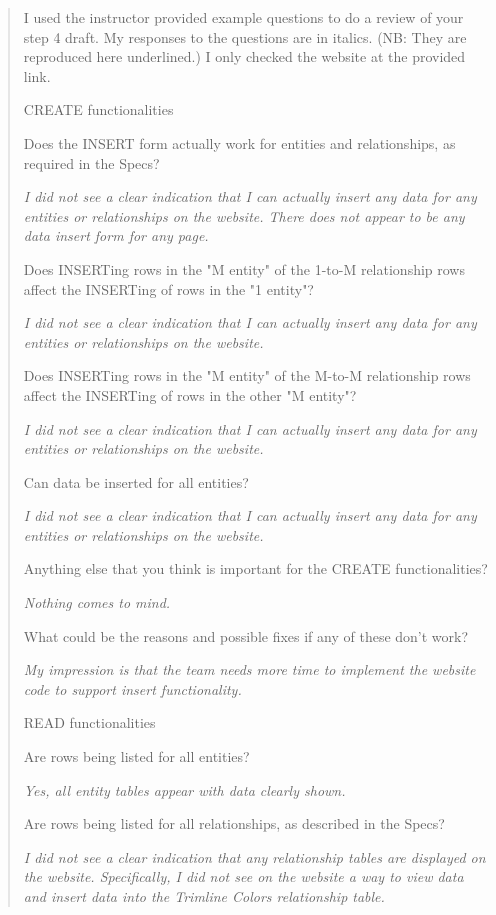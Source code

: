 \documentclass[11pt,letterpaper,oneside]{amsart}
\begin{document}
\begin{quotation}

I used the instructor provided example questions to do a review of your step 4 draft. My responses to the questions are in italics. (NB: They are reproduced here underlined.) I only checked the website at the provided link.
 
CREATE functionalities

Does the INSERT form actually work for entities and relationships, as required in the Specs?

\emph{I did not see a clear indication that I can actually insert any data for any entities or relationships on the website. There does not appear to be any data insert form for any page.}

Does INSERTing rows in the "M entity" of the 1-to-M relationship rows affect the INSERTing of rows in the "1 entity"?

\emph{I did not see a clear indication that I can actually insert any data for any entities or relationships on the website.}

Does INSERTing rows in the "M entity" of the M-to-M relationship rows affect the INSERTing of rows in the other "M entity"?

\emph{I did not see a clear indication that I can actually insert any data for any entities or relationships on the website.}

Can data be inserted for all entities?

\emph{I did not see a clear indication that I can actually insert any data for any entities or relationships on the website.}

Anything else that you think is important for the CREATE functionalities?

\emph{Nothing comes to mind.}

What could be the reasons and possible fixes if any of these don't work?

\emph{My impression is that the team needs more time to implement the website code to support insert functionality.}

READ functionalities

Are rows being listed for all entities?

\emph{Yes, all entity tables appear with data clearly shown.}

Are rows being listed for all relationships, as described in the Specs?

\emph{I did not see a clear indication that any relationship tables are displayed on the website. Specifically, I did not see on the website a way to view data and insert data into the Trimline Colors relationship table.}


\end{quotation}
\end{document}
